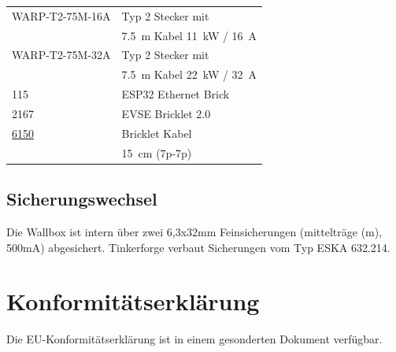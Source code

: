 \documentclass[a4paper,10pt]{article}
\begin{document}
\begin{multicols*}{2}
\begin{tabular}{ll}
		\cmidrule(lr{0.5em}){1-2}
		WARP-T2-75M-16A                                                                                                          & Typ 2 Stecker mit                                             \\
		                                                                                                                         & \SI{7,5}{\meter} Kabel \SI{11}{\kilo\watt} / \SI{16}{\ampere} \\
		\cmidrule(lr{0.5em}){1-2}
		WARP-T2-75M-32A                                                                                                          & Typ 2 Stecker mit                                             \\
		                                                                                                                         & \SI{7,5}{\meter} Kabel \SI{22}{\kilo\watt} / \SI{32}{\ampere} \\
		\cmidrule(lr{0.5em}){1-2}
		115																														 & ESP32 Ethernet Brick                                                   \\
		\cmidrule(lr{0.5em}){1-2}
		2167																													 & EVSE Bricklet                                                 2.0 \\
		\cmidrule(lr{0.5em}){1-2}
		\href{https://www.tinkerforge.com/de/shop/accessories/cable/bricklet-cable-15cm-7p-7p.html}{6150}                        & Bricklet Kabel                                                \\
		                                                                                                                         & \SI{15}{\centi\meter} (7p-7p)                                 \\
	\end{tabular}

	\subsection{Sicherungswechsel}
	Die Wallbox ist intern über zwei 6,3x32mm Feinsicherungen (mittelträge (m), 500mA) abgesichert.
	Tinkerforge verbaut Sicherungen vom Typ \glqq ESKA  632.214\grqq.

	\vfill
	\section{Konformitätserklärung}
	Die EU-Konformitätserklärung ist in einem gesonderten Dokument verfügbar.


\end{multicols*}
\end{document}
